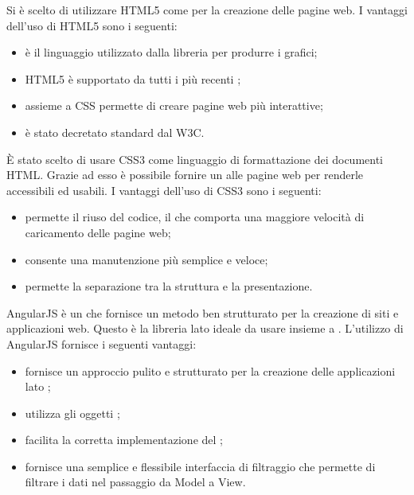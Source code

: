 Si è scelto di utilizzare HTML5 come  per la creazione delle pagine web.
I vantaggi dell'uso di HTML5 sono i seguenti:
\begin{itemize}
\item è il linguaggio utilizzato dalla libreria  per produrre i grafici;
\item HTML5 è supportato da tutti i più recenti ;
\item assieme a CSS permette di creare pagine web più interattive;
\item è stato decretato standard dal W3C.
\end{itemize}

È stato scelto di usare CSS3 come linguaggio di formattazione dei documenti HTML. Grazie ad esso è possibile fornire un  alle pagine web per renderle accessibili ed usabili.
I vantaggi dell'uso di CSS3 sono i seguenti:
\begin{itemize}
\item permette il riuso del codice, il che comporta una maggiore velocità di caricamento delle pagine web;
\item consente una manutenzione più semplice e veloce;
\item permette la separazione tra la struttura e la presentazione.
\end{itemize}

AngularJS è un    che fornisce un metodo ben strutturato per la creazione di siti e applicazioni web. Questo  è la libreria lato  ideale da usare insieme a .
L'utilizzo di AngularJS fornisce i seguenti vantaggi:
\begin{itemize}
\item fornisce un approccio pulito e strutturato per la creazione delle applicazioni lato ;
\item utilizza gli oggetti ;
\item facilita la corretta implementazione del  ;
\item fornisce una semplice e flessibile interfaccia di filtraggio che permette di filtrare i dati nel passaggio da Model a View.
\end{itemize}

